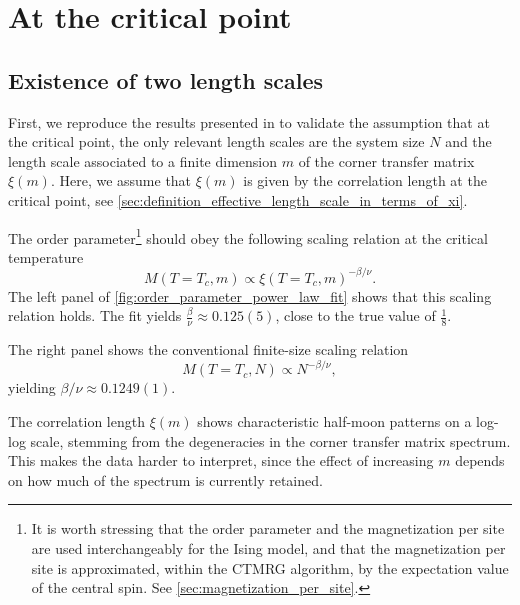 
\section{At the critical point}

\subsection{Existence of two length scales}

First, we reproduce the results presented in \cite{nishino1996numerical} to validate the assumption that at the critical
point, the only relevant length scales are the system size $N$ and the length scale associated to a finite dimension $m$
of the corner transfer matrix $\xi(m)$.
Here, we assume that $\xi(m)$ is given by the correlation length at the critical point,
see \autoref{sec:definition_effective_length_scale_in_terms_of_xi}.

The order parameter\footnote{It is worth stressing that the order parameter and the magnetization per site are used
interchangeably for the Ising model, and that the magnetization per site is approximated,
within the CTMRG algorithm, by the expectation value of the central spin.
See \autoref{sec:magnetization_per_site}.} should obey the following scaling relation at the critical temperature
\begin{equation}\label{eq:order_param_scaling_relation_finite_m}
  M(T = T_c,m) \propto \xi(T = T_c, m)^{-\beta/\nu}.
\end{equation}
The left panel of \autoref{fig:order_parameter_power_law_fit} shows that this scaling relation holds.
The fit yields $\frac{\beta}{\nu} \approx 0.125(5)$, close to the true value of $\frac{1}{8}$.

The right panel shows the conventional finite-size scaling relation
\begin{equation}\label{eq:order_param_scaling_relation_finite_N}
  M(T = T_c, N) \propto N^{-\beta/\nu},
\end{equation}
yielding $\beta/\nu \approx 0.1249(1)$.

The correlation length $\xi(m)$ shows characteristic half-moon patterns on a
log-log scale, stemming from the degeneracies in the corner transfer matrix spectrum. This
makes the data harder to interpret, since the effect of increasing $m$ depends on how much
of the spectrum is currently retained.

